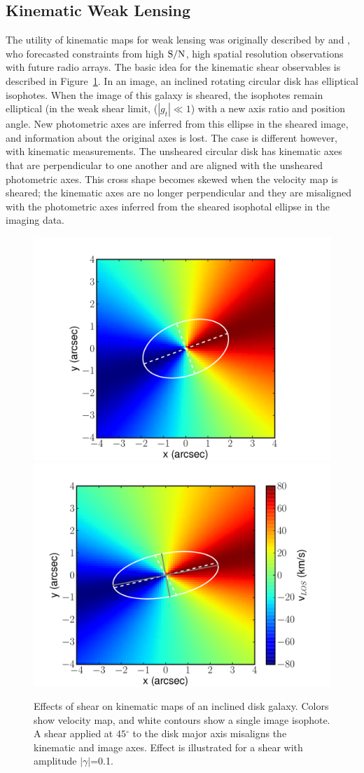 \documentclass[12pt]{article}
\newcommand{\degr}{\ensuremath{^\circ}}
\begin{document}
\subsection{Kinematic Weak Lensing}

The utility of kinematic maps for weak lensing was originally described by \citet{Blain2002} and \citet{Morales2006}, who forecasted constraints from high ${\rm S/N}$, high spatial resolution observations with future radio arrays. The basic idea for the kinematic shear observables is described in Figure~\ref{fig:vmaps}. In an image, an inclined rotating circular disk has elliptical isophotes. When the image of this galaxy is sheared, the isophotes remain elliptical (in the weak shear limit, ($|g_t|\ll1$) with a new axis ratio and position angle. New photometric axes are inferred from this ellipse in the sheared image, and information about the original axes is lost. The case is different however, with kinematic measurements. The unsheared circular disk has kinematic axes that are perpendicular to one another and are aligned with the unsheared photometric axes. This cross shape becomes skewed when the velocity map is sheared; the kinematic axes are no longer perpendicular and they are misaligned with the photometric axes inferred from the sheared isophotal ellipse in the imaging data.

\begin{figure}[t]
\begin{center}
\includegraphics[width=0.45\linewidth]{Plots/fig1a.pdf}
\includegraphics[width=0.45\linewidth]{Plots/fig1b.pdf}
\caption{Effects of shear on kinematic maps of an inclined disk galaxy. Colors show velocity map, and white contours show a single image isophote. A shear applied at $45\degr$ to the disk major axis misaligns the kinematic and image axes. Effect is illustrated for a shear with amplitude $|\gamma|$=0.1.}
\label{fig:vmaps}
\end{center}
\end{figure}
\end{document}
